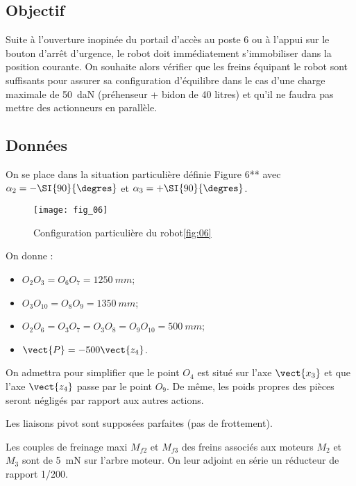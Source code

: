\subsection{Objectif }

Suite à l’ouverture inopinée du portail d’accès au poste 6 ou à l’appui sur le bouton d’arrêt 
d’urgence, le robot doit immédiatement s’immobiliser dans la position courante. On souhaite 
alors vérifier que les freins équipant le robot sont suffisants pour assurer sa configuration 
d’équilibre dans le cas d’une charge maximale de \SI{50}{daN} (préhenseur + bidon de 40 litres) et 
qu’il ne faudra pas mettre des actionneurs en parallèle.


\subsection{Données}
On se place dans la situation particulière définie Figure 6** avec $\alpha_2= -\SI{90}{\degres}$ et $\alpha_3= +\SI{90}{\degres}$.

\begin{figure}[H]
\centering
\texttt{[image: fig\_06]}
\caption{Configuration particulière du robot\ref{fig:06}}
\end{figure}


On donne : 
\begin{itemize}
\item $O_2O_3 = O_6O_7 = \SI{1250}{mm}$; 
\item $O_3O_{10} = O_8O_9 = \SI{1350}{mm}$; 
\item $O_2O_6 = O_3O_7 = O_3O_8 = O_9O_{10} = \SI{500}{mm}$; 
\item $\vect{P} = -500\vect{z_4}$. 
\end{itemize}

On admettra pour simplifier que le point $O_4$ est situé sur l’axe $\vect{x_3}$ et que l’axe $\vect{z_4}$ passe par le point $O_9$. De même, les poids propres des pièces seront négligés par rapport aux autres 
actions. 

Les liaisons pivot sont supposées parfaites (pas de frottement). 

Les couples de freinage maxi $M_{f2}$ et $M_{f3}$ des freins associés aux moteurs $M_2$ et $M_3$ sont de 
\SI{5}{mN} sur l’arbre moteur. On leur adjoint en série un réducteur de rapport 1/200.



